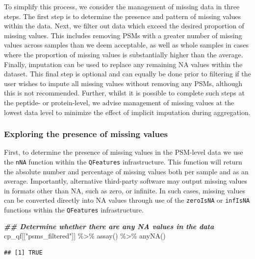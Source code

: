 \documentclass[9pt,a4paper,]{extarticle}
\newenvironment{Shaded}{\begin{snugshade}}{\end{snugshade}}
\newcommand{\DocumentationTok}[1]{\textcolor[rgb]{0.56,0.35,0.01}{\textbf{\textit{#1}}}}
\newcommand{\FunctionTok}[1]{\textcolor[rgb]{0.00,0.00,0.00}{#1}}
\newcommand{\NormalTok}[1]{#1}
\newcommand{\SpecialCharTok}[1]{\textcolor[rgb]{0.00,0.00,0.00}{#1}}
\newcommand{\StringTok}[1]{\textcolor[rgb]{0.31,0.60,0.02}{#1}}
\begin{document}
To simplify this process, we consider the management of missing data in three
steps. The first step is to determine the presence and pattern of missing values
within the data. Next, we filter out data which exceed the desired proportion of
missing values. This includes removing PSMs with a greater number of missing
values across samples than we deem acceptable, as well as whole samples in cases
where the proportion of missing values is substantially higher than the average.
Finally, imputation can be used to replace any remaining NA values within the
dataset. This final step is optional and can equally be done prior to filtering
if the user wishes to impute all missing values without removing any PSMs,
although this is not recommended. Further, whilst it is possible to complete
such steps at the peptide- or protein-level, we advise management of missing
values at the lowest data level to minimize the effect of implicit imputation
during aggregation.

\hypertarget{exploring-the-presence-of-missing-values}{%
\subsubsection{Exploring the presence of missing values}\label{exploring-the-presence-of-missing-values}}

First, to determine the presence of missing values in the PSM-level data we use
the \texttt{nNA} function within the \texttt{QFeatures} infrastructure. This function will
return the absolute number and percentage of missing values both per sample and
as an average. Importantly, alternative third-party software may output missing
values in formats other than NA, such as zero, or infinite. In such cases,
missing values can be converted directly into NA values through use of the
\texttt{zeroIsNA} or \texttt{infIsNA} functions within the \texttt{QFeatures} infrastructure.

\begin{Shaded}
\begin{Highlighting}[]
\DocumentationTok{\#\# Determine whether there are any NA values in the data}
\NormalTok{cp\_qf[[}\StringTok{"psms\_filtered"}\NormalTok{]] }\SpecialCharTok{\%\textgreater{}\%}
  \FunctionTok{assay}\NormalTok{() }\SpecialCharTok{\%\textgreater{}\%}
  \FunctionTok{anyNA}\NormalTok{()}
\end{Highlighting}
\end{Shaded}

\begin{verbatim}
## [1] TRUE
\end{verbatim}
\end{document}
